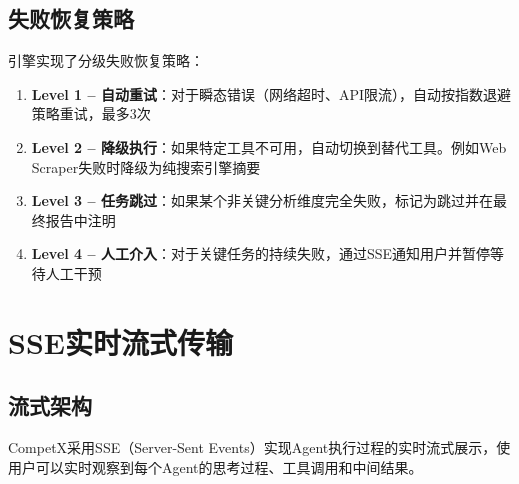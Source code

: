 \documentclass[12pt,a4paper]{ctexrep}
\begin{document}
\subsection{失败恢复策略}

引擎实现了分级失败恢复策略：

\begin{enumerate}[leftmargin=2em]
\item \textbf{Level 1 -- 自动重试}：对于瞬态错误（网络超时、API限流），自动按指数退避策略重试，最多3次
\item \textbf{Level 2 -- 降级执行}：如果特定工具不可用，自动切换到替代工具。例如Web Scraper失败时降级为纯搜索引擎摘要
\item \textbf{Level 3 -- 任务跳过}：如果某个非关键分析维度完全失败，标记为跳过并在最终报告中注明
\item \textbf{Level 4 -- 人工介入}：对于关键任务的持续失败，通过SSE通知用户并暂停等待人工干预
\end{enumerate}

\section{SSE实时流式传输}

\subsection{流式架构}

CompetX采用SSE（Server-Sent Events）\cite{sse2015}实现Agent执行过程的实时流式展示，使用户可以实时观察到每个Agent的思考过程、工具调用和中间结果。
\end{document}
